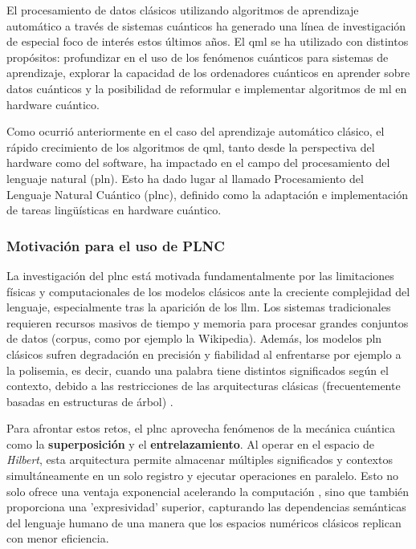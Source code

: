 El procesamiento de datos clásicos utilizando algoritmos de aprendizaje automático a través de sistemas cuánticos ha generado una línea de investigación de especial foco de interés estos últimos años. El \gls{qml} se ha utilizado con distintos propósitos: profundizar en el uso de los fenómenos cuánticos para sistemas de aprendizaje, explorar la capacidad de los ordenadores cuánticos en aprender sobre datos cuánticos y la posibilidad de reformular e implementar algoritmos de \gls{ml} en hardware cuántico.

Como ocurrió anteriormente en el caso del aprendizaje automático clásico, el rápido crecimiento de los algoritmos de \gls{qml}, tanto desde la perspectiva del hardware como del software, ha impactado en el campo del procesamiento del lenguaje natural (\gls{pln}). Esto ha dado lugar al llamado Procesamiento del Lenguaje Natural Cuántico (\gls{plnc}), definido como la adaptación e implementación de tareas lingüísticas en hardware cuántico.

\subsubsection{Motivación para el uso de PLNC}

La investigación del \gls{plnc} está motivada fundamentalmente por las limitaciones físicas y computacionales de los modelos clásicos ante la creciente complejidad del lenguaje, especialmente tras la aparición de los \gls{llm}. Los sistemas tradicionales requieren recursos masivos de tiempo y memoria para procesar grandes conjuntos de datos (corpus, como por ejemplo la Wikipedia). Además, los modelos \gls{pln} clásicos sufren degradación en precisión y fiabilidad al enfrentarse por ejemplo a la polisemia, es decir, cuando una palabra tiene distintos significados según el contexto, debido a las restricciones de las arquitecturas clásicas (frecuentemente basadas en estructuras de árbol) \cite{guarasci_qnlp_2022}.

Para afrontar estos retos, el \gls{plnc} aprovecha fenómenos de la mecánica cuántica como la \textbf{superposición} y el \textbf{entrelazamiento}. Al operar en el espacio de \textit{Hilbert}, esta arquitectura permite almacenar múltiples significados y contextos simultáneamente en un solo registro y ejecutar operaciones en paralelo. Esto no solo ofrece una ventaja exponencial acelerando la computación \cite{qnlp_comp_survey}, sino que también proporciona una 'expresividad' superior, capturando las dependencias semánticas del lenguaje humano de una manera que los espacios numéricos clásicos replican con menor eficiencia.

